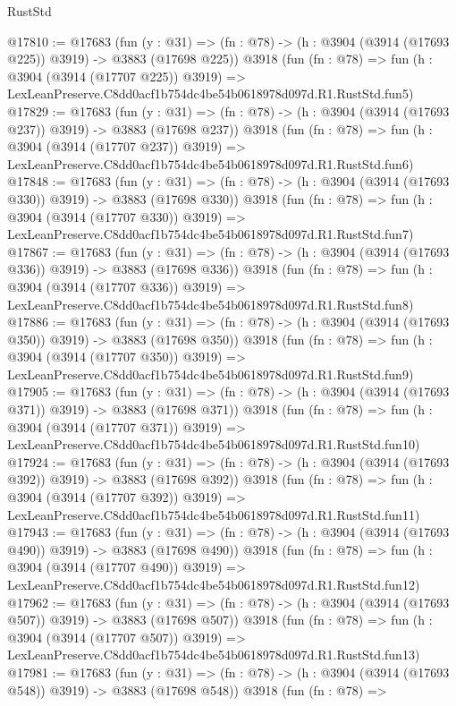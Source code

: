 \begin{lexlean}{RustStd}
\begin{coremodule}
@17810 := @17683
    (fun (y : @31) => (fn : @78) -> (h : @3904 (@3914 (@17693 @225)) @3919) -> @3883 (@17698 @225))
    @3918
    (fun (fn : @78) =>
    fun (h : @3904 (@3914 (@17707 @225)) @3919) =>
    LexLeanPreserve.C8dd0acf1b754dc4be54b0618978d097d.R1.RustStd.fun5)
@17829 := @17683
    (fun (y : @31) => (fn : @78) -> (h : @3904 (@3914 (@17693 @237)) @3919) -> @3883 (@17698 @237))
    @3918
    (fun (fn : @78) =>
    fun (h : @3904 (@3914 (@17707 @237)) @3919) =>
    LexLeanPreserve.C8dd0acf1b754dc4be54b0618978d097d.R1.RustStd.fun6)
@17848 := @17683
    (fun (y : @31) => (fn : @78) -> (h : @3904 (@3914 (@17693 @330)) @3919) -> @3883 (@17698 @330))
    @3918
    (fun (fn : @78) =>
    fun (h : @3904 (@3914 (@17707 @330)) @3919) =>
    LexLeanPreserve.C8dd0acf1b754dc4be54b0618978d097d.R1.RustStd.fun7)
@17867 := @17683
    (fun (y : @31) => (fn : @78) -> (h : @3904 (@3914 (@17693 @336)) @3919) -> @3883 (@17698 @336))
    @3918
    (fun (fn : @78) =>
    fun (h : @3904 (@3914 (@17707 @336)) @3919) =>
    LexLeanPreserve.C8dd0acf1b754dc4be54b0618978d097d.R1.RustStd.fun8)
@17886 := @17683
    (fun (y : @31) => (fn : @78) -> (h : @3904 (@3914 (@17693 @350)) @3919) -> @3883 (@17698 @350))
    @3918
    (fun (fn : @78) =>
    fun (h : @3904 (@3914 (@17707 @350)) @3919) =>
    LexLeanPreserve.C8dd0acf1b754dc4be54b0618978d097d.R1.RustStd.fun9)
@17905 := @17683
    (fun (y : @31) => (fn : @78) -> (h : @3904 (@3914 (@17693 @371)) @3919) -> @3883 (@17698 @371))
    @3918
    (fun (fn : @78) =>
    fun (h : @3904 (@3914 (@17707 @371)) @3919) =>
    LexLeanPreserve.C8dd0acf1b754dc4be54b0618978d097d.R1.RustStd.fun10)
@17924 := @17683
    (fun (y : @31) => (fn : @78) -> (h : @3904 (@3914 (@17693 @392)) @3919) -> @3883 (@17698 @392))
    @3918
    (fun (fn : @78) =>
    fun (h : @3904 (@3914 (@17707 @392)) @3919) =>
    LexLeanPreserve.C8dd0acf1b754dc4be54b0618978d097d.R1.RustStd.fun11)
@17943 := @17683
    (fun (y : @31) => (fn : @78) -> (h : @3904 (@3914 (@17693 @490)) @3919) -> @3883 (@17698 @490))
    @3918
    (fun (fn : @78) =>
    fun (h : @3904 (@3914 (@17707 @490)) @3919) =>
    LexLeanPreserve.C8dd0acf1b754dc4be54b0618978d097d.R1.RustStd.fun12)
@17962 := @17683
    (fun (y : @31) => (fn : @78) -> (h : @3904 (@3914 (@17693 @507)) @3919) -> @3883 (@17698 @507))
    @3918
    (fun (fn : @78) =>
    fun (h : @3904 (@3914 (@17707 @507)) @3919) =>
    LexLeanPreserve.C8dd0acf1b754dc4be54b0618978d097d.R1.RustStd.fun13)
@17981 := @17683
    (fun (y : @31) => (fn : @78) -> (h : @3904 (@3914 (@17693 @548)) @3919) -> @3883 (@17698 @548))
    @3918
    (fun (fn : @78) =>

\end{coremodule}
\end{lexlean}
